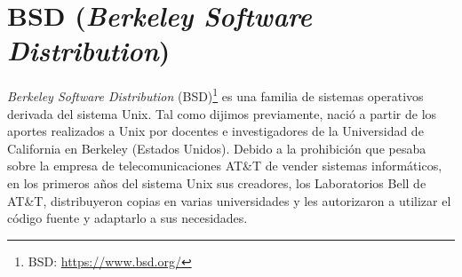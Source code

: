 %
%


\section{BSD (\emph{Berkeley Software Distribution})}

\emph{Berkeley Software Distribution} (BSD)\footnote{BSD: \url{https://www.bsd.org/}} es una familia de sistemas operativos derivada del sistema Unix. Tal como dijimos previamente, nació a partir de los aportes realizados a Unix por docentes e investigadores de la Universidad de California en Berkeley (Estados Unidos). Debido a la prohibición que pesaba sobre la empresa de telecomunicaciones AT\&T de vender sistemas informáticos, en los primeros años del sistema Unix sus creadores, los Laboratorios Bell de AT\&T, distribuyeron copias en varias universidades y les autorizaron a utilizar el código fuente y adaptarlo a sus necesidades.


